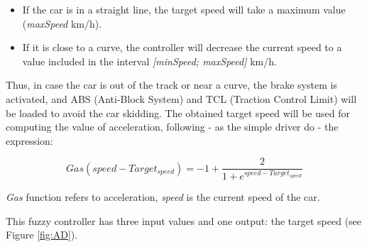 \documentclass[runningheads,a4paper]{llncs}
\begin{document}
	\begin{itemize}
		\item If the car is in a straight line, the target speed will take a maximum value (\textit{maxSpeed} km/h).
		\item If it is close to a curve, the controller will decrease the current speed to a value included in the interval \textit{[minSpeed; maxSpeed]} km/h.
	\end{itemize}
	
	Thus, in case the car is out of the track or near a curve, the brake system is activated, and ABS (Anti-Block System) and TCL (Traction Control Limit) will be loaded to avoid the car skidding. The obtained target speed will be used for computing the value of acceleration, following - as the simple driver do - the expression:
	
	\begin{equation}	
	Gas(speed-Target_{speed})=-1+\frac{2}{1+e^{speed-Target_{speed}}}	
	\end{equation}
	
	\textit{Gas} function refers to acceleration, \textit{speed} is the current speed of the car.
	
	This fuzzy controller has three input values and one output: the target speed (see Figure \ref{fig:AD}).
	
\end{document}
